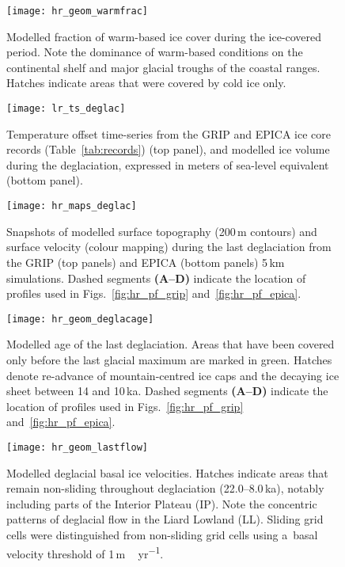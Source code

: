 \documentclass[tc, manuscript]{copernicus}
\begin{document}
\begin{figure}%
\texttt{[image: hr\_geom\_warmfrac]}
\caption{%
Modelled fraction of warm-based ice cover during the ice-covered
           period. Note the dominance of warm-based conditions on the
           continental shelf and major glacial troughs of the coastal ranges.
           Hatches indicate areas that were covered by cold ice only.}
\label{fig:hr_geom_warmfrac}%
\end{figure}%


\begin{figure}%
\texttt{[image: lr\_ts\_deglac]}
\caption{%
Temperature offset time-series from the GRIP and EPICA ice core
           records (Table~\ref{tab:records}) (top panel), and modelled ice
           volume during the deglaciation, expressed in meters of sea-level
           equivalent (bottom panel).}
\label{fig:lr_ts_deglac}%
\end{figure}%


\begin{figure}%
\texttt{[image: hr\_maps\_deglac]}
\caption{%
Snapshots of modelled surface topography (200\,\unit{m} contours)
           and surface velocity (colour mapping) during the last deglaciation
           from the GRIP (top panels) and EPICA (bottom panels) 5\,\unit{km} simulations.
           Dashed segments \textbf{(A--D)} indicate the location of profiles used in
           Figs.~\ref{fig:hr_pf_grip} and~\ref{fig:hr_pf_epica}.}
\label{fig:hr_geom_deglacageshots}%
\end{figure}%


\begin{figure}%
\texttt{[image: hr\_geom\_deglacage]}
\caption{%
Modelled age of the last deglaciation. Areas that have been covered
           only before the last glacial maximum are marked
           in green. Hatches denote re-advance of mountain-centred ice caps and
           the decaying ice sheet between 14 and 10\,\unit{ka}.
           Dashed segments \textbf{(A--D)} indicate the location of profiles used in
           Figs.~\ref{fig:hr_pf_grip} and~\ref{fig:hr_pf_epica}.}
\label{fig:hr_geom_deglacage}%
\end{figure}%


\begin{figure}%
\texttt{[image: hr\_geom\_lastflow]}
\caption{%
Modelled deglacial basal ice velocities. Hatches
           indicate areas that remain non-sliding throughout deglaciation
           (22.0--8.0\,\unit{ka}), notably including parts of the Interior Plateau (IP).
           Note the concentric patterns of deglacial flow in the Liard
           Lowland (LL).
           Sliding grid cells were distinguished from non-sliding grid cells
           using a~basal velocity threshold of 1\,\unit{m\,yr^{-1}}.}
\label{fig:hr_geom_lastflow}%
\end{figure}%
\end{document}
